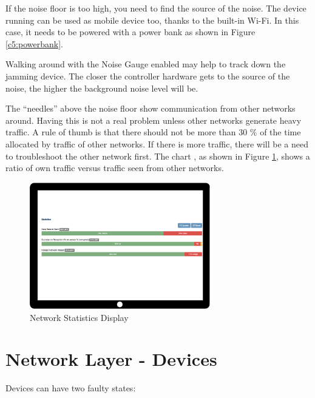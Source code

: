 If the noise floor is too high, you need to find the source of the noise. The device running \zway can be 
used as mobile device too, thanks to the built-in Wi-Fi. In this case, it needs to be 
powered with a power bank as shown in Figure \ref{c5:powerbank}.

Walking around with the Noise Gauge enabled may help to track down the jamming device. The 
closer the controller hardware gets to the source of the noise, the higher the background noise level will be.

The ``needles'' above the noise floor show communication from other \zwave networks around. 
Having this is not a real problem unless other networks generate heavy traffic. A rule of 
thumb is that there should not be more than 30 \% of the time allocated by traffic of 
other \zwave networks. If there is more traffic, there will be a need to troubleshoot 
the other \zwave network first. The chart , as shown 
in Figure \ref{c5:networkstat}, shows a ratio of own traffic versus traffic 
seen from other networks.

\begin{figure}
\begin{center}
\includegraphics[width=0.7\textwidth]{pngs/cap8/c5networkstatistics.png}
\caption{Network Statistics Display}
\label{c5:networkstat}
\end{center}
\end{figure}

\section{Network Layer - Devices}

Devices can have two faulty states:

